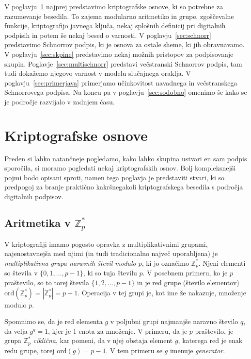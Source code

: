 \documentclass[isrm2, tisk]{fmfdelo}
\newcommand{\Z}{\mathbb Z}
\begin{document}
V poglavju~\ref{sec:osnove} najprej predstavimo kriptografske osnove, ki so potrebne za razumevanje besedila.
To zajema modularno aritmetiko in grupe, zgoščevalne funkcije, kriptografijo javnega ključa, nekaj
splošnih definicij pri digitalnih podpisih in potem še nekaj besed o varnosti. V poglavju~\ref{sec:schnorr}
predstavimo Schnorrov podpis, ki je osnova za ostale sheme, ki jih obravnavamo. V 
poglavju~\ref{sec:skpine} predstavimo nekaj možnih pristopov za podpisovanje skupin. Poglavje~\ref{sec:multischnorr}
predstavi večstranski Schnorrov podpis, tam tudi dokažemo njegovo varnost v modelu slučajnega oraklja.
V poglavju~\ref{sec:primerjava} primerjamo učinkovitost navadnega in večstranskega Schnorrovega podpisa.
Na koncu pa v poglavju~\ref{sec:sodobno} omenimo še kako se je področje razvijalo v zadnjem času.

\section{Kriptografske osnove}
\label{sec:osnove}
Preden si lahko natančneje pogledamo, kako lahko skupina ustvari en sam podpis sporočila, si moramo 
pogledati nekaj kriptografskih osnov. Bolj kompleksnejši pojmi bodo opisani sproti, namen tega 
poglavja je predstaviti stvari, ki so predpogoj za branje praktično kakršnegakoli kriptografskega 
besedila s področja digitalnih podpisov.

\subsection{Aritmetika v \texorpdfstring{$\Z_p^*$}{Zp∗}}
V kriptografiji imamo pogosto opravka z multiplikativnimi grupami, najenostavnejša med njimi (in
tudi tradicionalno največ uporabljena) je \textit{multiplikativna grupa naravnih števil modulo $p$},
ki jo označimo $\Z_p^*$. Njeni elementi so števila v $\{0, 1, \dots, p - 1\}$, ki so tuja številu $p$.
V posebnem primeru, ko je $p$ praštevilo, so to torej števila $\{1, 2, \dots, p - 1\}$ in je red grupe
(število elementov) $\text{ord}(\Z_p^*) = |\Z_p^*| = p - 1$. Operacija v tej grupi je, kot ime že
nakazuje, množenje modulo $p$.

Spomnimo se, da je red elementa $g$ v poljubni grupi najmanjše naravno število $q$, da velja $g^q = 1$,
kjer je $1$ enota za množenje. V primeru, da je $p$ praštevilo, je grupa $\Z_p^*$ \textit{ciklična},
kar pomeni, da v njej obstaja element $g$, katerega red je enak redu grupe, torej $\text{ord}(g) = p - 1$.
V tem primeru se $g$ imenuje \textit{generator}.
\end{document}

